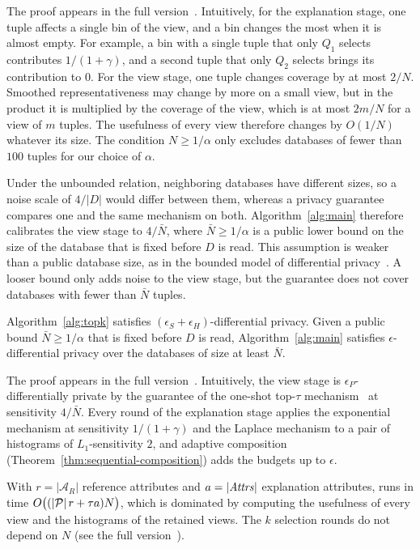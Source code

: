 The proof appears in \ifpaper the full version~\cite{fullversion}\else {}\fi.
Intuitively, for the explanation stage, one tuple affects a single bin of the view, and a bin changes the most when it is almost empty.
For example, a bin with a single tuple that only $Q_1$ selects contributes $1/(1+\gamma)$, and a second tuple that only $Q_2$ selects brings its contribution to $0$.
For the view stage, one tuple changes coverage by at most $2/N$.
Smoothed representativeness may change by more on a small view, but in the product it is multiplied by the coverage of the view, which is at most $2m/N$ for a view of $m$ tuples.
The usefulness of every view therefore changes by $O(1/N)$ whatever its size.
The condition $N\ge1/\alpha$ only excludes databases of fewer than $100$ tuples for our choice of $\alpha$.

Under the unbounded relation, neighboring databases have different sizes, so a noise scale of $4/|D|$ would differ between them, whereas a privacy guarantee compares one and the same mechanism on both.
Algorithm~\ref{alg:main} therefore calibrates the view stage to $4/\bar N$, where $\bar N\ge1/\alpha$ is a public lower bound on the size of the database that is fixed before $D$ is read.
This assumption is weaker than a public database size, as in the bounded model of differential privacy~\cite{DBLP:series/synthesis/2016Li}.
A looser bound only adds noise to the view stage, but the guarantee does not cover databases with fewer than $\bar N$ tuples.

\begin{theorem}
\label{thm:framework-dp}
Algorithm~\ref{alg:topk} satisfies $(\epsilon_S+\epsilon_H)$-differential privacy.
Given a public bound $\bar N\ge1/\alpha$ that is fixed before $D$ is read, Algorithm~\ref{alg:main} satisfies $\epsilon$-differential privacy over the databases of size at least $\bar N$.
\end{theorem}

The proof appears in \ifpaper the full version~\cite{fullversion}\else {}\fi.
Intuitively, the view stage is $\epsilon_P$-differentially private by the guarantee of the one-shot top-$\tau$ mechanism~\cite{DurfeeRogers19} at sensitivity $4/\bar N$.
Every round of the explanation stage applies the exponential mechanism at sensitivity $1/(1+\gamma)$ and the Laplace mechanism to a pair of histograms of $L_1$-sensitivity $2$, and adaptive composition (Theorem~\ref{thm:sequential-composition}) adds the budgets up to $\epsilon$.

\label{subsec:complexity-analysis}
With $r=|\mathcal{A}_R|$ reference attributes and $a=|\mathit{Attrs}|$ explanation attributes, \sys{} runs in time $O\big((|\mathcal{P}|\,r + \tau a)N\big)$, which is dominated by computing the usefulness of every view and the histograms of the retained views.
The $k$ selection rounds do not depend on $N$ (see \ifpaper the full version~\cite{fullversion}\else {}\fi).
